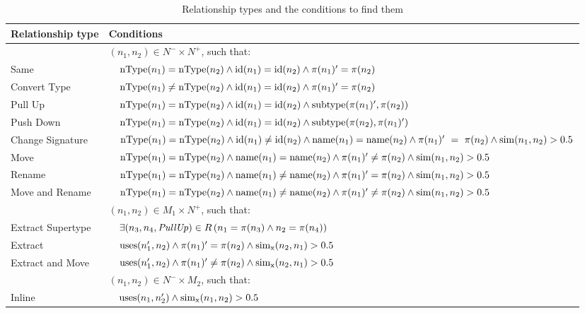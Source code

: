 \begin{table}[htbp]
\renewcommand{\arraystretch}{1.2}
\caption{Relationship types and the conditions to find them}
\label{TabRelationshipTypes}
\centering
\footnotesize
\begin{tabular}{@{}llp{11.5cm}@{}}
\toprule
Relationship type & \multicolumn{2}{l}{Conditions} \\
\midrule
& \multicolumn{2}{l}{$(n_1, n_2) \in N^- \times N^+$, such that:}\\
Same & & $\operatorname{nType}(n_1) = \operatorname{nType}(n_2) \land \operatorname{id}(n_1) = \operatorname{id}(n_2) \land \operatorname{\pi}(n_1)' = \operatorname{\pi}(n_2)$ \\
Convert Type & & $\operatorname{nType}(n_1) \neq \operatorname{nType}(n_2) \land \operatorname{id}(n_1) = \operatorname{id}(n_2) \land \operatorname{\pi}(n_1)' = \operatorname{\pi}(n_2)$ \\
Pull Up & & $\operatorname{nType}(n_1) = \operatorname{nType}(n_2) \land \operatorname{id}(n_1) = \operatorname{id}(n_2) \land \operatorname{subtype}(\operatorname{\pi}(n_1)', \operatorname{\pi}(n_2))$ \\
Push Down & & $\operatorname{nType}(n_1) = \operatorname{nType}(n_2) \land \operatorname{id}(n_1) = \operatorname{id}(n_2) \land \operatorname{subtype}(\operatorname{\pi}(n_2), \operatorname{\pi}(n_1)')$ \\
Change Signature & & $\operatorname{nType}(n_1) = \operatorname{nType}(n_2) \land \operatorname{id}(n_1) \neq \operatorname{id}(n_2) \land \operatorname{name}(n_1) = \operatorname{name}(n_2) \land \operatorname{\pi}(n_1)'~=~\operatorname{\pi}(n_2) \land \operatorname{sim}(n_1, n_2) > 0.5$ \\
Move & & $\operatorname{nType}(n_1) = \operatorname{nType}(n_2) \land \operatorname{name}(n_1) = \operatorname{name}(n_2) \land \operatorname{\pi}(n_1)' \neq \operatorname{\pi}(n_2) \land \operatorname{sim}(n_1, n_2) > 0.5$ \\
Rename & & $\operatorname{nType}(n_1) = \operatorname{nType}(n_2) \land \operatorname{name}(n_1) \neq \operatorname{name}(n_2) \land \operatorname{\pi}(n_1)' = \operatorname{\pi}(n_2) \land \operatorname{sim}(n_1, n_2) > 0.5$ \\
Move and Rename & & $\operatorname{nType}(n_1) = \operatorname{nType}(n_2) \land \operatorname{name}(n_1) \neq \operatorname{name}(n_2) \land \operatorname{\pi}(n_1)' \neq \operatorname{\pi}(n_2) \land \operatorname{sim}(n_1, n_2) > 0.5$ \\
\addlinespace
& \multicolumn{2}{l}{$(n_1, n_2) \in M_1 \times N^+$, such that:}\\
Extract Supertype & & $\exists (n_3, n_4, \mathit{PullUp}) \in R\, (n_1 = \operatorname{\pi}(n_3) \land n_2 = \operatorname{\pi}(n_4))$ \\
Extract & & $\operatorname{uses}(n_1', n_2) \land \operatorname{\pi}(n_1)' = \operatorname{\pi}(n_2) \land \operatorname{sim_{x}}(n_2, n_1) > 0.5$ \\
Extract and Move & & $\operatorname{uses}(n_1', n_2) \land \operatorname{\pi}(n_1)' \neq \operatorname{\pi}(n_2) \land \operatorname{sim_{x}}(n_2, n_1) > 0.5$ \\
\addlinespace
& \multicolumn{2}{l}{$(n_1, n_2) \in N^- \times M_2$, such that:}\\
Inline & & $\operatorname{uses}(n_1, n_2') \land \operatorname{sim_{x}}(n_1, n_2) > 0.5$ \\
\bottomrule
\end{tabular}
\end{table}







